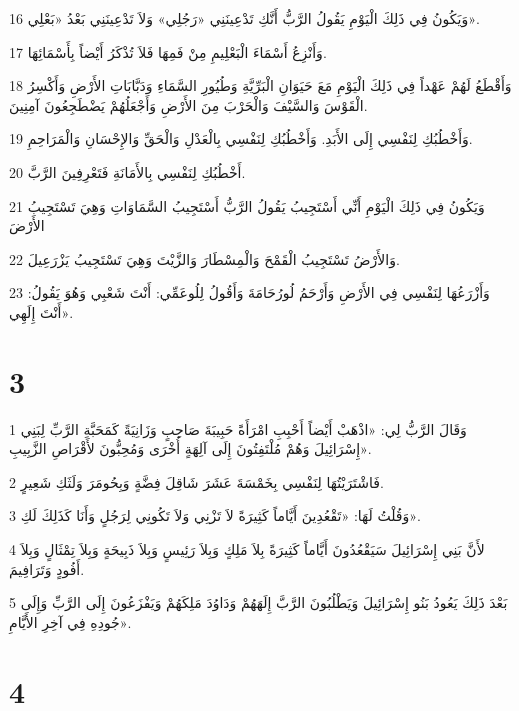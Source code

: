 \par 16 وَيَكُونُ فِي ذَلِكَ الْيَوْمِ يَقُولُ الرَّبُّ أَنَّكِ تَدْعِينَنِي «رَجُلِي» وَلاَ تَدْعِينَنِي بَعْدُ «بَعْلِي».
\par 17 وَأَنْزِعُ أَسْمَاءَ الْبَعْلِيمِ مِنْ فَمِهَا فَلاَ تُذْكَرُ أَيْضاً بِأَسْمَائِهَا.
\par 18 وَأَقْطَعُ لَهُمْ عَهْداً فِي ذَلِكَ الْيَوْمِ مَعَ حَيَوَانِ الْبَرِّيَّةِ وَطُيُورِ السَّمَاءِ وَدَبَّابَاتِ الأَرْضِ وَأَكْسِرُ الْقَوْسَ وَالسَّيْفَ وَالْحَرْبَ مِنَ الأَرْضِ وَأَجْعَلُهُمْ يَضْطَجِعُونَ آمِنِينَ.
\par 19 وَأَخْطُبُكِ لِنَفْسِي إِلَى الأَبَدِ. وَأَخْطُبُكِ لِنَفْسِي بِالْعَدْلِ وَالْحَقِّ وَالإِحْسَانِ وَالْمَرَاحِمِ.
\par 20 أَخْطُبُكِ لِنَفْسِي بِالأَمَانَةِ فَتَعْرِفِينَ الرَّبَّ.
\par 21 وَيَكُونُ فِي ذَلِكَ الْيَوْمِ أَنِّي أَسْتَجِيبُ يَقُولُ الرَّبُّ أَسْتَجِيبُ السَّمَاوَاتِ وَهِيَ تَسْتَجِيبُ الأَرْضَ
\par 22 وَالأَرْضُ تَسْتَجِيبُ الْقَمْحَ وَالْمِسْطَارَ وَالزَّيْتَ وَهِيَ تَسْتَجِيبُ يَزْرَعِيلَ.
\par 23 وَأَزْرَعُهَا لِنَفْسِي فِي الأَرْضِ وَأَرْحَمُ لُورُحَامَةَ وَأَقُولُ لِلُوعَمِّي: أَنْتَ شَعْبِي وَهُوَ يَقُولُ: أَنْتَ إِلَهِي».

\chapter{3}

\par 1 وَقَالَ الرَّبُّ لِي: «اذْهَبْ أَيْضاً أَحْبِبِ امْرَأَةً حَبِيبَةَ صَاحِبٍ وَزَانِيَةً كَمَحَبَّةِ الرَّبِّ لِبَنِي إِسْرَائِيلَ وَهُمْ مُلْتَفِتُونَ إِلَى آلِهَةٍ أُخْرَى وَمُحِبُّونَ لأَقْرَاصِ الزَّبِيبِ».
\par 2 فَاشْتَرَيْتُهَا لِنَفْسِي بِخَمْسَةَ عَشَرَ شَاقِلَ فِضَّةٍ وَبِحُومَرَ وَلَثَكِ شَعِيرٍ.
\par 3 وَقُلْتُ لَهَا: «تَقْعُدِينَ أَيَّاماً كَثِيرَةً لاَ تَزْنِي وَلاَ تَكُونِي لِرَجُلٍ وَأَنَا كَذَلِكَ لَكِ».
\par 4 لأَنَّ بَنِي إِسْرَائِيلَ سَيَقْعُدُونَ أَيَّاماً كَثِيرَةً بِلاَ مَلِكٍ وَبِلاَ رَئِيسٍ وَبِلاَ ذَبِيحَةٍ وَبِلاَ تِمْثَالٍ وَبِلاَ أَفُودٍ وَتَرَافِيمَ.
\par 5 بَعْدَ ذَلِكَ يَعُودُ بَنُو إِسْرَائِيلَ وَيَطْلُبُونَ الرَّبَّ إِلَهَهُمْ وَدَاوُدَ مَلِكَهُمْ وَيَفْزَعُونَ إِلَى الرَّبِّ وَإِلَى جُودِهِ فِي آخِرِ الأَيَّامِ».

\chapter{4}

